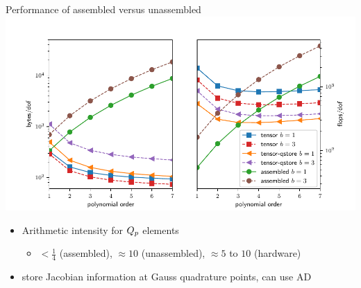 \begin{frame}[shrink=5]{Performance of assembled versus unassembled}
  \vspace{1ex}
  \includegraphics[width=\textwidth]{figures/TensorVsAssembly-qstore} \\
  \begin{itemize}
  \item Arithmetic intensity for $Q_{p}$ elements
    \begin{itemize}
    \item $< \frac 1 4$ (assembled), $\approx 10$ (unassembled), $\approx 5$ to $10$ (hardware)
    \end{itemize}
  \item store Jacobian information at Gauss quadrature points, can use AD
  \end{itemize}
\end{frame}
